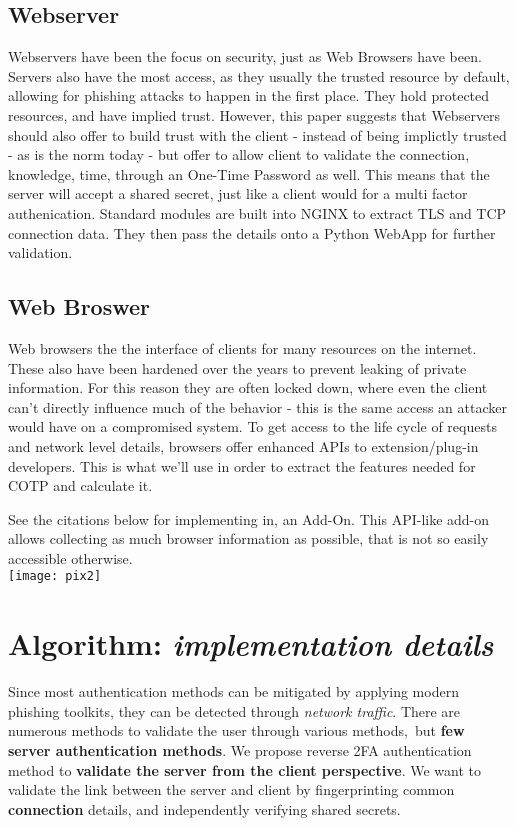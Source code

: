 \documentclass[a4paper, 11pt]{article} 				%
\begin{document}
\subsection{Webserver}
Webservers have been the focus on security, just as Web Browsers have been. Servers also have the most access, as they usually the trusted resource by default, allowing for phishing attacks to happen in the first place. They hold protected resources, and have implied trust. However, this paper suggests that Webservers should also offer to build trust with the client - instead of being implictly trusted - as is the norm today - but offer to allow client to validate the connection, knowledge, time, through an One-Time Password as well. This means that the server will accept a shared secret, just like a client would for a multi factor authenication. Standard modules are built into NGINX to extract TLS and TCP connection data. They then pass the details onto a Python WebApp for further validation.

\subsection{Web Broswer}
Web browsers the the interface of clients for many resources on the internet. These also have been hardened over the years to prevent leaking of private information. For this reason they are often locked down, where even the client can't directly influence much of the behavior - this is the same access an attacker would have on a compromised system. To get access to the life cycle of requests and network level details, browsers offer enhanced APIs to extension/plug-in developers. This is what we'll use in order to extract the features needed for COTP and calculate it.

\noindent
[10][11][12][13]See the citations below for implementing in, an Add-On. This API-like add-on allows collecting as much browser information as possible, that is not so easily accessible otherwise.\\

\texttt{[image: pix2]}


\section{Algorithm: \textit{implementation details}}
Since most authentication methods can be mitigated by applying modern phishing toolkits,
they can be detected through \textit{network traffic}.
There are numerous methods to validate the user through various methods, but \textbf{few server authentication methods}.
We propose reverse 2FA authentication method to \textbf{validate the server from the client perspective}.
We want to validate the link between the server and client by fingerprinting common \textbf{connection} details, and independently verifying shared secrets.\\ 
\end{document}
